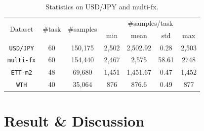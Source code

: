 \documentclass[aps,prb,groupedaddress,twocolumn,showpacs,dvipdfmx,superscriptaddress,pdftex]{revtex4-2}
\begin{document}
\begin{table}
    \centering
    \caption{Statistics on USD/JPY and multi-fx.}
    \label{tab:stat_}
    \begin{tabular}{ccccccc}
    \toprule
    \multirow{2}{*}{Dataset} & \multirow{2}{*}{\#task} & \multirow{2}{*}{\#samples} & \multicolumn{4}{c}{\#samples/task}  \\
    \cline{4-7}
                             &                         &                            & min & mean  & std   & max             \\
    \hline
    \Verb|USD/JPY|           & 60                      & 150,175                     & 2,502 & 2,502.92 & 0.28 & 2,503           \\
    \Verb|multi-fx|          & 60                      & 154,440                     & 2,467 & 2,575 & 58.61   & 2748           \\
    \Verb|ETT-m2|            & 48                      & 69,680                      & 1,451 & 1,451.67 & 0.47   & 1,452           \\
    \Verb|WTH|               & 40                      & 35,064                      & 876 & 876.6 & 0.49   & 877           \\
    \bottomrule
    \end{tabular}
\end{table}

\section{Result \& Discussion}
\label{sec.results}


\end{document}
